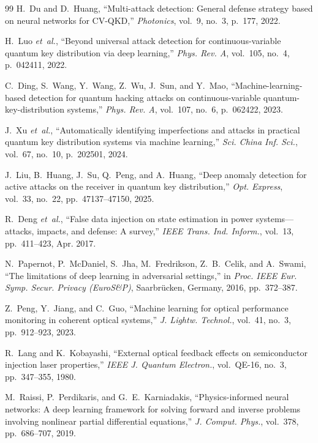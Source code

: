 \documentclass[journal,twocolumn]{IEEEtran}
\begin{document}
\begin{thebibliography}{99}
H.~Du and D.~Huang,
``Multi-attack detection: General defense strategy based on neural networks for CV-QKD,''
\emph{Photonics}, vol.~9, no.~3, p.~177, 2022.

H.~Luo \emph{et~al.},
``Beyond universal attack detection for continuous-variable quantum key distribution via
deep learning,''
\emph{Phys. Rev. A}, vol.~105, no.~4, p.~042411, 2022.

C.~Ding, S.~Wang, Y.~Wang, Z.~Wu, J.~Sun, and Y.~Mao,
``Machine-learning-based detection for quantum hacking attacks on continuous-variable
quantum-key-distribution systems,''
\emph{Phys. Rev. A}, vol.~107, no.~6, p.~062422, 2023.

J.~Xu \emph{et~al.},
``Automatically identifying imperfections and attacks in practical quantum key
 distribution systems via machine learning,''
\emph{Sci. China Inf. Sci.}, vol.~67, no.~10, p.~202501, 2024.

J.~Liu, B.~Huang, J.~Su, Q.~Peng, and A.~Huang,
``Deep anomaly detection for active attacks on the receiver in quantum key distribution,''
\emph{Opt. Express}, vol.~33, no.~22, pp.~47137--47150, 2025.

R.~Deng \emph{et~al.},
``False data injection on state estimation in power systems---attacks, impacts,
and defense: A survey,''
\emph{IEEE Trans. Ind. Inform.}, vol.~13, pp.~411--423, Apr. 2017.

N.~Papernot, P.~McDaniel, S.~Jha, M.~Fredrikson, Z.~B.~Celik, and A.~Swami,
``The limitations of deep learning in adversarial settings,''
in \emph{Proc. IEEE Eur. Symp. Secur. Privacy (EuroS\&P)}, Saarbrücken, Germany,
2016, pp.~372--387.

Z.~Peng, Y.~Jiang, and C.~Guo,
``Machine learning for optical performance monitoring in coherent optical systems,''
\emph{J. Lightw. Technol.}, vol.~41, no.~3, pp.~912--923, 2023.

R.~Lang and K.~Kobayashi,
``External optical feedback effects on semiconductor injection laser properties,''
\emph{IEEE J. Quantum Electron.}, vol.~QE-16, no.~3, pp.~347--355, 1980.

M.~Raissi, P.~Perdikaris, and G.~E.~Karniadakis,
``Physics-informed neural networks: A deep learning framework for solving forward
and inverse problems involving nonlinear partial differential equations,''
\emph{J. Comput. Phys.}, vol.~378, pp.~686--707, 2019.


\end{thebibliography}
\end{document}
